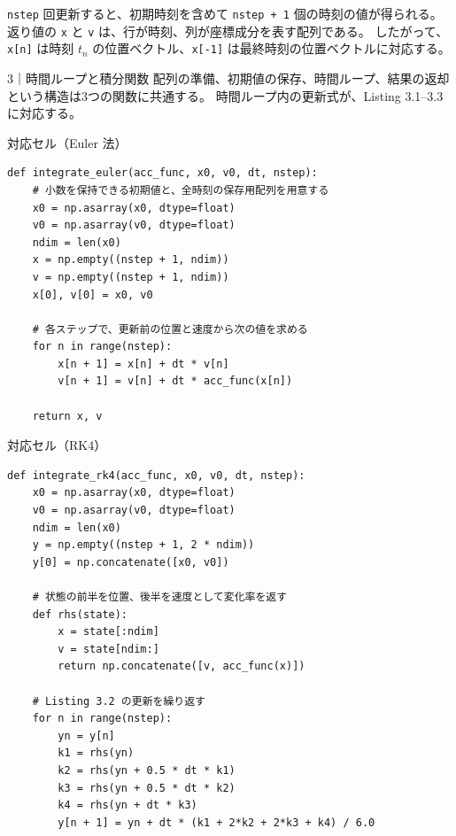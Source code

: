 \texttt{nstep} 回更新すると、初期時刻を含めて \texttt{nstep + 1} 個の時刻の値が得られる。
返り値の \texttt{x} と \texttt{v} は、行が時刻、列が座標成分を表す配列である。
したがって、\texttt{x[n]} は時刻 $t_n$ の位置ベクトル、\texttt{x[-1]} は最終時刻の位置ベクトルに対応する。
\begin{notebookblock}{3｜時間ループと積分関数}
配列の準備、初期値の保存、時間ループ、結果の返却という構造は3つの関数に共通する。
時間ループ内の更新式が、Listing 3.1--3.3 に対応する。

\par\smallskip\noindent\begin{minipage}{\linewidth}
{\sffamily\small\color{graytext}対応セル（Euler 法）}
\begin{Verbatim}[xleftmargin=2mm,fontsize=\small,frame=single,framesep=1.8mm,framerule=0.35pt,rulecolor=\color{listingframe},fillcolor=\color{listingbg}]
def integrate_euler(acc_func, x0, v0, dt, nstep):
    # 小数を保持できる初期値と、全時刻の保存用配列を用意する
    x0 = np.asarray(x0, dtype=float)
    v0 = np.asarray(v0, dtype=float)
    ndim = len(x0)
    x = np.empty((nstep + 1, ndim))
    v = np.empty((nstep + 1, ndim))
    x[0], v[0] = x0, v0

    # 各ステップで、更新前の位置と速度から次の値を求める
    for n in range(nstep):
        x[n + 1] = x[n] + dt * v[n]
        v[n + 1] = v[n] + dt * acc_func(x[n])

    return x, v
\end{Verbatim}
\end{minipage}

\par\smallskip\noindent\begin{minipage}{\linewidth}
{\sffamily\small\color{graytext}対応セル（RK4）}
\begin{Verbatim}[xleftmargin=2mm,fontsize=\small,frame=single,framesep=1.8mm,framerule=0.35pt,rulecolor=\color{listingframe},fillcolor=\color{listingbg}]
def integrate_rk4(acc_func, x0, v0, dt, nstep):
    x0 = np.asarray(x0, dtype=float)
    v0 = np.asarray(v0, dtype=float)
    ndim = len(x0)
    y = np.empty((nstep + 1, 2 * ndim))
    y[0] = np.concatenate([x0, v0])

    # 状態の前半を位置、後半を速度として変化率を返す
    def rhs(state):
        x = state[:ndim]
        v = state[ndim:]
        return np.concatenate([v, acc_func(x)])

    # Listing 3.2 の更新を繰り返す
    for n in range(nstep):
        yn = y[n]
        k1 = rhs(yn)
        k2 = rhs(yn + 0.5 * dt * k1)
        k3 = rhs(yn + 0.5 * dt * k2)
        k4 = rhs(yn + dt * k3)
        y[n + 1] = yn + dt * (k1 + 2*k2 + 2*k3 + k4) / 6.0


\end{Verbatim}
\end{minipage}
\end{notebookblock}
